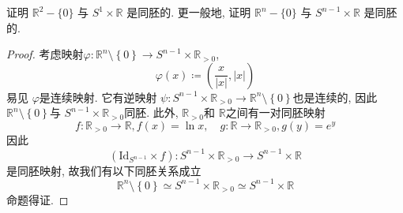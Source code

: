 \documentclass[../main.tex]{subfiles}
\begin{document}
\begin{exercise}{}{}
 证明 $\mathbb{R}^2 - \{0\}$ 与 $S^1 \times \mathbb{R}$ 是同胚的. 更一般地, 证明 $\mathbb{R}^n - \{0\}$ 与 $S^{n-1} \times \mathbb{R}$ 是同胚的.
\end{exercise}
\begin{proof}
    考虑映射\(   \varphi :\mathbb{R} ^{n}\setminus \left\{ 0 \right\}\to S^{n-1}\times \mathbb{R}_{> 0}   \), \[
     \varphi \left( x \right)\coloneqq \left( \frac{x }{\left| x \right|  },  \left| x \right|   \right) 
    \] 易见 \(  \varphi    \)是连续映射. 它有逆映射 \(  \psi :S^{n-1}\times \mathbb{R}_{> 0} \to \mathbb{R} ^{n}\setminus \left\{ 0 \right\}  \)也是连续的, 因此 \(  \mathbb{R} ^{n}\setminus \left\{ 0 \right\}  \)与 \(  S^{n-1}\times \mathbb{R} _{> 0}  \)同胚.  此外, \(  \mathbb{R} _{> 0}  \)和 \(  \mathbb{R}   \)之间有一对同胚映射 \[
    f:\mathbb{R} _{> 0}\to \mathbb{R} ,f\left( x \right)= \ln x,\quad g:\mathbb{R} \to \mathbb{R} _{> 0},g\left( y \right)= e^{y}  
    \]  因此 \[
    \left( \mathrm{Id}_{S^{n-1}}\times f  \right): S^{n-1}\times \mathbb{R} _{> 0}\to S^{n-1}\times \mathbb{R}  
    \]是同胚映射, 故我们有以下同胚关系成立 \[
    \mathbb{R} ^{n}\setminus \left\{ 0 \right\}\simeq S^{n-1}\times \mathbb{R} _{> 0}\simeq  S^{n-1}\times \mathbb{R} 
    \]命题得证.
\end{proof}
\end{document}

